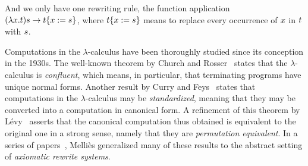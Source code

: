 And we only have one rewriting rule, the function application
$(\lambda x. t) s \to t\{x := s\}$,
where $t\{x := s\}$ means to replace every occurrence of $x$ in $t$ with $s$.

Computations in the $\lambda$-calculus have been thoroughly
studied since its conception in the 1930s.
The well-known theorem by Church and Rosser~\cite{church1936some}
states that the $\lambda$-calculus is \emph{confluent},
which means, in particular, that terminating programs have unique normal forms.
Another result by Curry and Feys~\cite{curry1958combinatory}
states that computations in the
$\lambda$-calculus may be \emph{standardized},
meaning that they may be converted into a computation in canonical form.
A refinement of this theorem by L\'evy~\cite{Tesis:Levy:1978}
asserts that the canonical computation thus obtained is equivalent to the
original one in a strong sense, namely that they are \emph{permutation equivalent}.
In a series of papers~\cite{DBLP:conf/ctcs/Mellies97,DBLP:journals/logcom/Mellies00,DBLP:conf/rta/Mellies02,mellies2002axiomatic,DBLP:conf/birthday/Mellies05},
Melli\`es generalized many of these results to the abstract setting of {\em axiomatic rewrite systems}.

